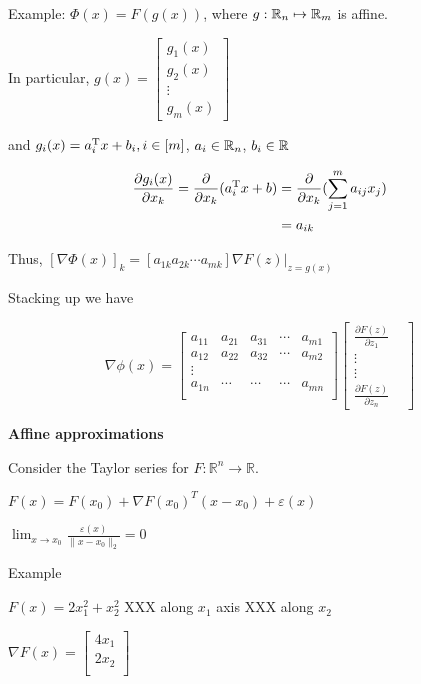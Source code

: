 Example: $\Phi(x)=F(g(x))$, where $g:\mathbb{R}_{n}\mapsto\mathbb{R}_{m}$ is affine. 

In particular, $g(x)=\left[ 
\begin{array}{c} 
	g_{1}(x) \\
	g_{2}(x) \\
	\vdots \\
	g_{m}(x)
\end{array}
\right]$

and $g_{i}(x)=a_{i}^{{\rm T}} x +b_{i}, i\in [m]$, $a_{i}\in\mathbb{R}_{n}$, $b_{i}\in\mathbb{R}$

\begin{align*}
\frac{\partial g_{i}(x)}{\partial x_{k}}=\frac{\partial}{\partial x_{k}}(a_{i}^{{\rm T}} x+b)
&=\frac{\partial}{\partial x_{k}}(\sum_{j=1}^{m}a_{ij}x_{j})\\
&=a_{ik}
\end{align*}

Thus, $[\nabla\Phi(x)]_{k}=[a_{1k} a_{2k} \cdots a_{mk}]\nabla F(z)|_{z=g(x)}$

Stacking up we have

$$\nabla \phi (x)=
\left[\begin{matrix}
a_{11}&a_{21}&a_{31}&\cdots&a_{m1}\\
a_{12}&a_{22}&a_{32}&\cdots&a_{m2}\\
\vdots& & & & \\
a_{1n}&\cdots&\cdots&\cdots&a_{mn}\\
\end{matrix}\right]
\left[
\begin{matrix}
\frac{\partial F(z)}{\partial z_{1}}&\\
\vdots&\\
\vdots&\\
\frac{\partial F(z)}{\partial z_{n}}&
\end{matrix}\right]
$$



\textbf{Affine approximations}

Consider the Taylor series for $F\colon \mathbb{R}^n \to \mathbb{R}$.

$F(x) = F(x_0) + \nabla F(x_0)^{T} (x - x_0) + \varepsilon (x) $

$\lim_{x \to x_0} \frac{\varepsilon (x)}{\| x - x_0 \|_2} = 0$

Example

$F(x) = 2 x_1^2 + x_2^2$ XXX along $x_1$ axis XXX along $x_2$

$\nabla F(x) = \begin{bmatrix} 4x_1\\ 2x_2\\ \end{bmatrix}$

